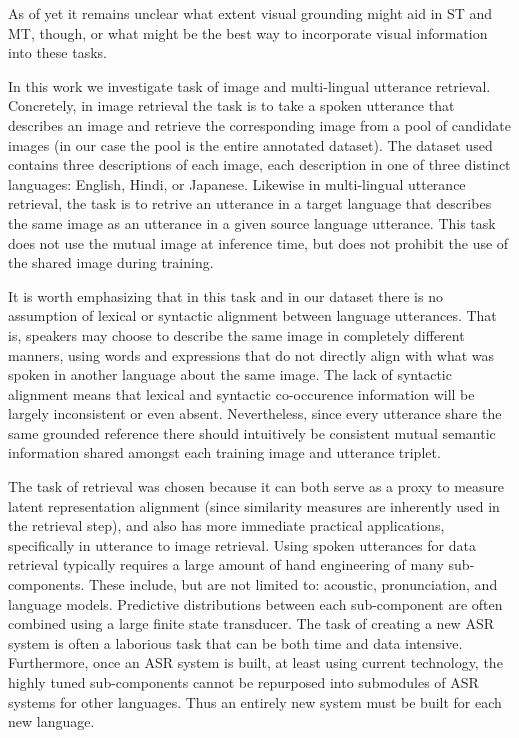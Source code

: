 As of yet it remains unclear what extent visual grounding might aid in ST and MT, though, or what might be the best way to incorporate visual information into these tasks.

In this work we investigate task of image and multi-lingual utterance retrieval.
Concretely, in image retrieval the task is to take a spoken utterance that describes an image and retrieve the corresponding image from a pool of candidate images (in our case the pool is the entire annotated dataset).
The dataset used contains three descriptions of each image, each description in one of three distinct languages: English, Hindi, or Japanese.
Likewise in multi-lingual utterance retrieval, the task is to retrive an utterance in a target language that describes the same image as an utterance in a given source language utterance.
This task does not use the mutual image at inference time, but does not prohibit the use of the shared image during training.

It is worth emphasizing that in this task and in our dataset there is no assumption of lexical or syntactic alignment between language utterances.
That is, speakers may choose to describe the same image in completely different manners, 
using words and expressions that do not directly align with what was spoken in another language about the same image.
The lack of syntactic alignment means that lexical and syntactic co-occurence information will be largely inconsistent or even absent.
Nevertheless, since every utterance share the same grounded reference there should intuitively be consistent mutual semantic information shared amongst each training image and utterance triplet.

The task of retrieval was chosen because it can both serve as a proxy to measure latent representation alignment (since similarity measures are inherently used in the retrieval step), and also has more immediate practical applications, specifically in utterance to image retrieval.
Using spoken utterances for data retrieval typically requires a large amount of hand engineering of many sub-components.
These include, but are not limited to: acoustic, pronunciation, and language models. 
Predictive distributions between each sub-component are often combined using a large finite state transducer.
The task of creating a new ASR system is often a laborious task that can be both time and data intensive.
Furthermore, once an ASR system is built, at least using current technology, the highly tuned sub-components cannot be repurposed into submodules of ASR systems for other languages. 
Thus an entirely new system must be built for each new language.


